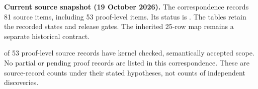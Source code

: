 \textbf{Current source snapshot (19 October 2026).} The correspondence records 81 source items, including 53 proof-level items. Its status is . The tables retain the recorded states and release gates. The inherited 25-row map remains a separate historical contract.
\par{} of 53 proof-level source records have kernel checked, semantically accepted scope. No partial or pending proof records are listed in this correspondence. These are source-record counts under their stated hypotheses, not counts of independent discoveries.
